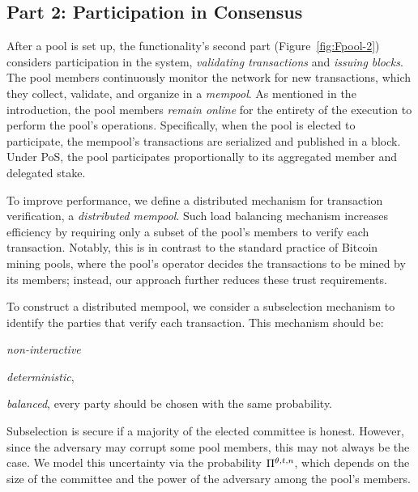 \subsection{Part 2: Participation in Consensus}\label{sec:participation}

After a pool is set up, the functionality's second part
(Figure~\ref{fig:Fpool-2}) considers participation in the system, \ie
\emph{validating transactions} and \emph{issuing blocks}.
The pool members continuously monitor the network for new transactions, which
they collect, validate, and organize in a \emph{mempool}.  As mentioned in the
introduction, the pool members \emph{remain online} for the entirety of the
execution to perform the pool's operations. Specifically, when the pool is
elected to participate, the mempool's transactions are serialized and published
in a block. Under PoS, the pool participates proportionally to its
aggregated member and delegated stake.

To improve performance, we define a distributed mechanism for transaction
verification, \ie a \emph{distributed mempool}. Such load balancing mechanism
increases efficiency by requiring only a subset of the pool's members to verify
each transaction. Notably, this is in contrast to the standard practice of
Bitcoin mining pools, where the pool's operator decides the transactions to be
mined by its members; instead, our approach further reduces these trust
requirements.

To construct a distributed mempool, we consider a subselection mechanism to
identify the parties that verify each transaction. This mechanism should be:
\begin{inparaenum}[a)]
    \item \emph{non-interactive}
    \item \emph{deterministic},
    \item \emph{balanced}, \ie every party should be chosen with the same
        probability.
\end{inparaenum}
Subselection is secure if a majority of the elected committee is honest.
However, since the adversary may corrupt some pool members, this may not always
be the case. We model this uncertainty via the probability
$\Pi^{\theta, t, n}$, which depends
on the size of the committee and the power of the adversary among the pool's
members.


